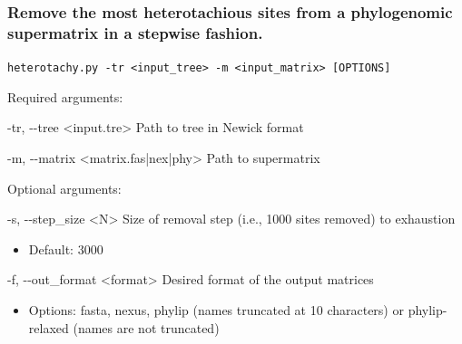 \documentclass{article}
\def\code#1{\texttt{#1}}
\begin{document}
        \subsubsection{Remove the most heterotachious sites from a phylogenomic supermatrix in a stepwise fashion.}
        \begin{description}
        
            \vspace{0.2cm}
            \item \code{heterotachy.py -tr <input\_tree> -m <input\_matrix> [OPTIONS]}
            \vspace{0.2cm}
            
            \begin{description}
                \item Required arguments:
                \begin{description}
                    \item -tr, -\/-tree \hspace{0.2cm} <input.tre> \hspace{0.2cm} Path to tree in Newick format
                    \item -m, -\/-matrix \hspace{0.2cm} <matrix.fas|nex|phy> \hspace{0.2cm} Path to supermatrix
                \end{description}
                \vspace{0.2cm}
                \item Optional arguments:
                \begin{description}
                    \item -s, -\/-step\_size \hspace{0.2cm} <N> \hspace{0.2cm} Size of removal step (i.e., 1000 sites removed) to exhaustion
                    \begin{itemize}
                        \item Default: 3000
                    \end{itemize}
                    \item -f, -\/-out\_format \hspace{0.2cm} <format> \hspace{0.2cm} Desired format of the output matrices
                    \begin{itemize}
                        \item Options: fasta, nexus, phylip (names truncated at 10 characters) or phylip-relaxed (names are not truncated)

\end{itemize}
\end{description}
\end{description}
\end{description}
\end{document}
